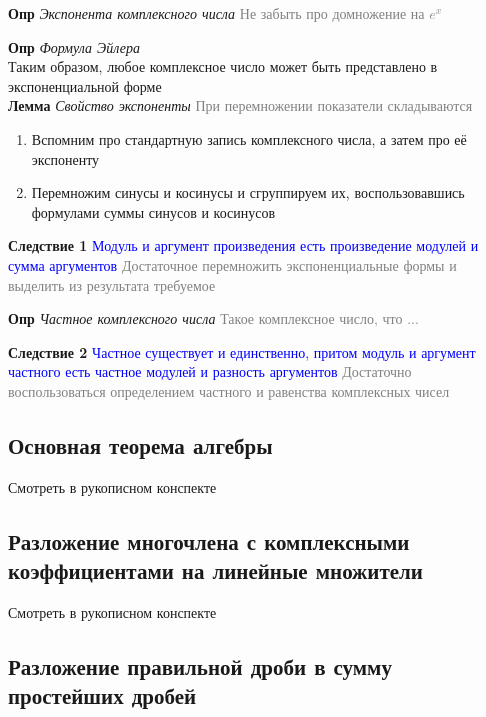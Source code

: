 \documentclass[a4paper, 14pt]{article}
\begin{document}
    \textbf{Опр} \textit{Экспонента комплексного числа} \textcolor{gray}{Не забыть про домножение на $e^x$}

    \textbf{Опр} \textit{Формула Эйлера} \\

    Таким образом, любое комплексное число может быть представлено в экспоненциальной форме \\

    \textbf{Лемма} \textit{Свойство экспоненты} \textcolor{gray}{При перемножении показатели складываются}

    \begin{enumerate}
        \item Вспомним про стандартную запись комплексного числа, а затем про её экспоненту
        \item Перемножим синусы и косинусы и сгруппируем их, воспользовавшись формулами суммы синусов и косинусов
    \end{enumerate}

    \textbf{Следствие 1}
    \textcolor{blue}{Модуль и аргумент произведения есть произведение модулей и сумма аргументов}
    \textcolor{gray}{Достаточное перемножить экспоненциальные формы и выделить из результата требуемое}

    \textbf{Опр} \textit{Частное комплексного числа} \textcolor{gray}{Такое комплексное число, что ...}

    \textbf{Следствие 2}
    \textcolor{blue}{Частное существует и единственно, притом модуль и аргумент частного есть частное модулей и
    разность аргументов}
    \textcolor{gray}{Достаточно воспользоваться определением частного и равенства комплексных чисел}

    \subsection{Основная теорема алгебры}

    Смотреть в рукописном конспекте

    \subsection{Разложение многочлена с комплексными коэффициентами на линейные множители}

    Смотреть в рукописном конспекте

    \subsection{Разложение правильной дроби в сумму простейших дробей}
\end{document}
